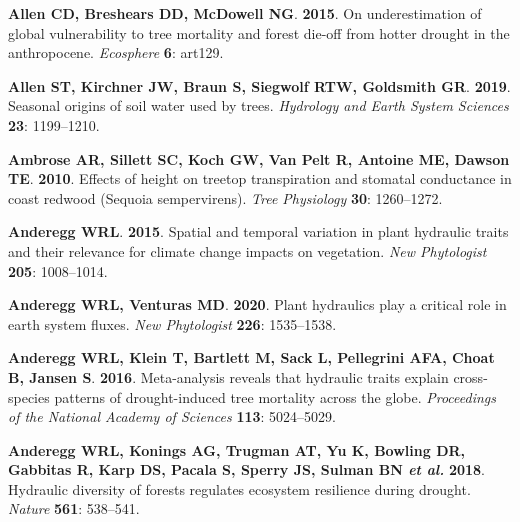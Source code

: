 \documentclass[11pt,twoside]{reedthesis}
\begin{document}
\hypertarget{ref-Allen2015}{}
\textbf{\textnormal{Allen CD}, \textnormal{Breshears DD},
\textnormal{McDowell NG}}. \textbf{2015}. On underestimation of global
vulnerability to tree mortality and forest die-off from hotter drought
in the anthropocene. \emph{Ecosphere} \textbf{6}: art129.

\hypertarget{ref-Allen2019}{}
\textbf{\textnormal{Allen ST}, \textnormal{Kirchner JW},
\textnormal{Braun S}, \textnormal{Siegwolf RTW}, \textnormal{Goldsmith
GR}}. \textbf{2019}. Seasonal origins of soil water used by trees.
\emph{Hydrology and Earth System Sciences} \textbf{23}: 1199--1210.

\hypertarget{ref-Ambrose2010}{}
\textbf{\textnormal{Ambrose AR}, \textnormal{Sillett SC},
\textnormal{Koch GW}, \textnormal{Van Pelt R}, \textnormal{Antoine ME},
\textnormal{Dawson TE}}. \textbf{2010}. Effects of height on treetop
transpiration and stomatal conductance in coast redwood (Sequoia
sempervirens). \emph{Tree Physiology} \textbf{30}: 1260--1272.

\hypertarget{ref-anderegg_spatial_2015}{}
\textbf{\textnormal{Anderegg WRL}}. \textbf{2015}. Spatial and temporal
variation in plant hydraulic traits and their relevance for climate
change impacts on vegetation. \emph{New Phytologist} \textbf{205}:
1008--1014.

\hypertarget{ref-AndereggVenturas2020}{}
\textbf{\textnormal{Anderegg WRL}, \textnormal{Venturas MD}}.
\textbf{2020}. Plant hydraulics play a critical role in earth system
fluxes. \emph{New Phytologist} \textbf{226}: 1535--1538.

\hypertarget{ref-anderegg_meta-analysis_2016}{}
\textbf{\textnormal{Anderegg WRL}, \textnormal{Klein T},
\textnormal{Bartlett M}, \textnormal{Sack L}, \textnormal{Pellegrini
AFA}, \textnormal{Choat B}, \textnormal{Jansen S}}. \textbf{2016}.
Meta-analysis reveals that hydraulic traits explain cross-species
patterns of drought-induced tree mortality across the globe.
\emph{Proceedings of the National Academy of Sciences} \textbf{113}:
5024--5029.

\hypertarget{ref-anderegg_hydraulic_2018}{}
\textbf{\textnormal{Anderegg WRL}, \textnormal{Konings AG},
\textnormal{Trugman AT}, \textnormal{Yu K}, \textnormal{Bowling DR},
\textnormal{Gabbitas R}, \textnormal{Karp DS}, \textnormal{Pacala S},
\textnormal{Sperry JS}, \textnormal{Sulman BN} \emph{et al.}}
\textbf{2018}. Hydraulic diversity of forests regulates ecosystem
resilience during drought. \emph{Nature} \textbf{561}: 538--541.
\end{document}
